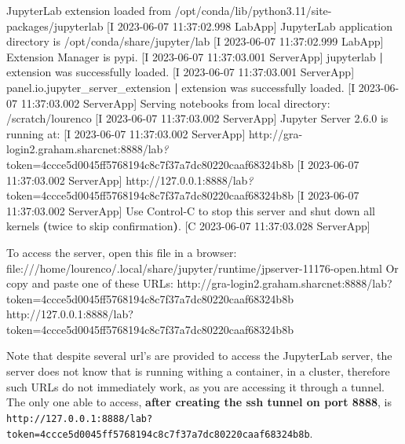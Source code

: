 \documentclass[
]{book}
\newenvironment{Shaded}{\begin{snugshade}}{\end{snugshade}}
\newcommand{\BuiltInTok}[1]{#1}
\newcommand{\ErrorTok}[1]{\textcolor[rgb]{0.64,0.00,0.00}{\textbf{#1}}}
\newcommand{\ExtensionTok}[1]{#1}
\newcommand{\KeywordTok}[1]{\textcolor[rgb]{0.13,0.29,0.53}{\textbf{#1}}}
\newcommand{\NormalTok}[1]{#1}
\newcommand{\PreprocessorTok}[1]{\textcolor[rgb]{0.56,0.35,0.01}{\textit{#1}}}
\newcommand{\StringTok}[1]{\textcolor[rgb]{0.31,0.60,0.02}{#1}}
\begin{document}
\begin{Shaded}
\begin{Highlighting}[]
\ExtensionTok{[I}\NormalTok{ 2023{-}06{-}07 11:37:02.998 LabApp] JupyterLab extension loaded from /opt/conda/lib/python3.11/site{-}packages/jupyterlab}
\ExtensionTok{[I}\NormalTok{ 2023{-}06{-}07 11:37:02.998 LabApp] JupyterLab application directory is /opt/conda/share/jupyter/lab}
\ExtensionTok{[I}\NormalTok{ 2023{-}06{-}07 11:37:02.999 LabApp] Extension Manager is }\StringTok{\textquotesingle{}pypi\textquotesingle{}}\NormalTok{.}
\ExtensionTok{[I}\NormalTok{ 2023{-}06{-}07 11:37:03.001 ServerApp] jupyterlab }\KeywordTok{|} \ExtensionTok{extension}\NormalTok{ was successfully loaded.}
\ExtensionTok{[I}\NormalTok{ 2023{-}06{-}07 11:37:03.001 ServerApp] panel.io.jupyter\_server\_extension }\KeywordTok{|} \ExtensionTok{extension}\NormalTok{ was successfully loaded.}
\ExtensionTok{[I}\NormalTok{ 2023{-}06{-}07 11:37:03.002 ServerApp] Serving notebooks from local directory: /scratch/lourenco}
\ExtensionTok{[I}\NormalTok{ 2023{-}06{-}07 11:37:03.002 ServerApp] Jupyter Server 2.6.0 is running at:}
\ExtensionTok{[I}\NormalTok{ 2023{-}06{-}07 11:37:03.002 ServerApp] http://gra{-}login2.graham.sharcnet:8888/lab}\PreprocessorTok{?}\NormalTok{token=4ccce5d0045ff5768194c8c7f37a7dc80220caaf68324b8b}
\ExtensionTok{[I}\NormalTok{ 2023{-}06{-}07 11:37:03.002 ServerApp]     http://127.0.0.1:8888/lab}\PreprocessorTok{?}\NormalTok{token=4ccce5d0045ff5768194c8c7f37a7dc80220caaf68324b8b}
\ExtensionTok{[I}\NormalTok{ 2023{-}06{-}07 11:37:03.002 ServerApp] Use Control{-}C to stop this server and shut down all kernels }\ErrorTok{(}\ExtensionTok{twice}\NormalTok{ to skip confirmation}\KeywordTok{)}\BuiltInTok{.}
\ExtensionTok{[C}\NormalTok{ 2023{-}06{-}07 11:37:03.028 ServerApp] }
    
    \ExtensionTok{To}\NormalTok{ access the server, open this file in a browser:}
        \ExtensionTok{file:///home/lourenco/.local/share/jupyter/runtime/jpserver{-}11176{-}open.html}
    \ExtensionTok{Or}\NormalTok{ copy and paste one of these URLs:}
        \ExtensionTok{http://gra{-}login2.graham.sharcnet:8888/lab?token=4ccce5d0045ff5768194c8c7f37a7dc80220caaf68324b8b}
        \ExtensionTok{http://127.0.0.1:8888/lab?token=4ccce5d0045ff5768194c8c7f37a7dc80220caaf68324b8b}
\end{Highlighting}
\end{Shaded}

Note that despite several url's are provided to access the JupyterLab server, the server does not know that is running withing a container, in a cluster, therefore such URLs do not immediately work, as you are accessing it through a tunnel. The only one able to access, \textbf{after creating the ssh tunnel on port 8888}, is \texttt{http://127.0.0.1:8888/lab?token=4ccce5d0045ff5768194c8c7f37a7dc80220caaf68324b8b}.
\end{document}
